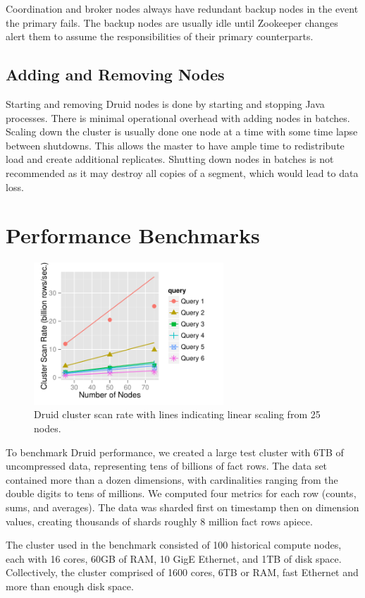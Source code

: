 \documentclass{vldb}
\begin{document}
Coordination and broker nodes always have redundant backup nodes in the event
the primary fails. The backup nodes are usually idle until Zookeeper changes alert
them to assume the responsibilities of their primary counterparts.

\subsection{Adding and Removing Nodes}
Starting and removing Druid nodes is done by starting and stopping Java processes. There is minimal
operational overhead with adding nodes in batches. Scaling down the
cluster is usually done one node at a time with some time lapse
between shutdowns. This allows the master to have ample time to
redistribute load and create additional replicates. Shutting down
nodes in batches is not recommended as it may destroy all
copies of a segment, which would lead to data loss.

\section{Performance Benchmarks}
\label{sec:benchmarks}
\begin{figure}
\centering
\includegraphics[width = 2.8in]{cluster_scan_rate}
\caption{Druid cluster scan rate with lines indicating linear scaling
  from 25 nodes.}
\label{fig:cluster_scan_rate}
\end{figure}
To benchmark Druid performance, we created a large test cluster with
6TB of uncompressed data, representing tens of billions of fact
rows. The data set contained more than a dozen dimensions, with
cardinalities ranging from the double digits to tens of millions. We computed
four metrics for each row (counts, sums, and averages). The data was
sharded first on timestamp then on dimension values, creating
thousands of shards roughly 8 million fact rows apiece.

The cluster used in the benchmark consisted of 100 historical compute
nodes, each with 16 cores, 60GB of RAM, 10 GigE Ethernet, and 1TB of
disk space. Collectively, the cluster comprised of 1600 cores, 6TB or
RAM, fast Ethernet and more than enough disk space.
\end{document}
